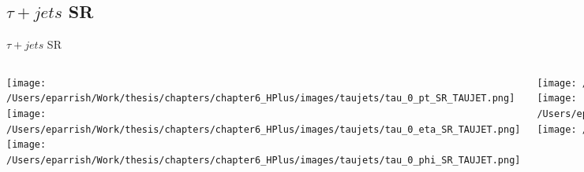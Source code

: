 \documentclass[aspectratio=169,xcolor=table]{beamer}
\begin{document}
  \subsection{$\tau+jets$ SR}

    \begin{frame}[t]{$\tau+jets$ SR}
      \begin{columns}[t]
          \texttt{[image: /Users/eparrish/Work/thesis/chapters/chapter6\_HPlus/images/taujets/tau\_0\_pt\_SR\_TAUJET.png]}
          \texttt{[image: /Users/eparrish/Work/thesis/chapters/chapter6\_HPlus/images/taujets/tau\_0\_eta\_SR\_TAUJET.png]}
          \texttt{[image: /Users/eparrish/Work/thesis/chapters/chapter6\_HPlus/images/taujets/tau\_0\_phi\_SR\_TAUJET.png]}

          \texttt{[image: /Users/eparrish/Work/thesis/chapters/chapter6\_HPlus/images/taujets/tau\_0\_upsilon\_SR\_TAUJET.png]}
          \texttt{[image: /Users/eparrish/Work/thesis/chapters/chapter6\_HPlus/images/taujets/tau\_0\_charged\_tracks\_0\_pt\_SR\_TAUJET.png]}
          \texttt{[image: /Users/eparrish/Work/thesis/chapters/chapter6\_HPlus/images/taujets/n\_jets\_SR\_TAUJET.png]}

          \texttt{[image: /Users/eparrish/Work/thesis/chapters/chapter6\_HPlus/images/taujets/met\_et\_SR\_TAUJET.png]}
          \texttt{[image: /Users/eparrish/Work/thesis/chapters/chapter6\_HPlus/images/taujets/met\_phi\_SR\_TAUJET.png]}
          \texttt{[image: /Users/eparrish/Work/thesis/chapters/chapter6\_HPlus/images/taujets/n\_bjets\_DL1r\_FixedCutBEff\_70\_SR\_TAUJET.png]}

          \texttt{[image: /Users/eparrish/Work/thesis/chapters/chapter6\_HPlus/images/taujets/bjet\_0\_pt\_SR\_TAUJET.png]}
          \texttt{[image: /Users/eparrish/Work/thesis/chapters/chapter6\_HPlus/images/taujets/bjet\_0\_eta\_SR\_TAUJET.png]}
          \texttt{[image: /Users/eparrish/Work/thesis/chapters/chapter6\_HPlus/images/taujets/bjet\_0\_phi\_SR\_TAUJET.png]}

      \end{columns}
    \end{frame}
\end{document}
